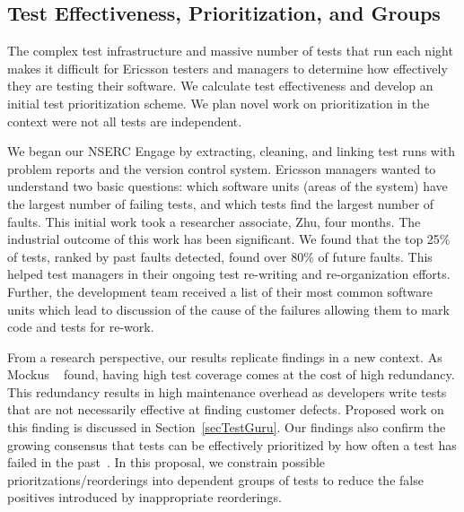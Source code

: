 \subsection{Test Effectiveness, Prioritization, and Groups}

The complex test infrastructure and massive number of tests that run each night makes it difficult for Ericsson testers and managers to determine how effectively they are testing their software. We calculate test effectiveness and develop an initial test prioritization scheme. We plan novel work on prioritization in the context were not all tests are independent.

We began our NSERC Engage by extracting, cleaning, and linking test runs with problem reports and the version control system. Ericsson managers wanted to understand two basic questions: which software units (areas of the system) have the largest number of failing tests, and which tests find the largest number of faults. 
%
This initial work took a researcher associate, Zhu, four months. The industrial outcome of this work has been significant. We found that the top 25\% of tests, ranked by past faults detected, found over 80\% of future faults.
%
%
This helped test managers in their ongoing test re-writing and re-organization efforts. Further, the development team received a list of their most common software units which lead to discussion of the cause of the failures allowing them to mark code and tests for re-work. 

From a research perspective, our results replicate findings in a new context. As Mockus \etal~\cite{Mockus2009ESEM} found, having high test coverage comes at the cost of high redundancy. This redundancy results in high maintenance overhead as developers write tests that are not necessarily effective at finding customer defects. Proposed work on this finding is discussed in Section~\ref{secTestGuru}. Our findings also confirm the growing consensus that tests can be effectively prioritized by how often a test has failed in the past~\cite{Kim2002ICSE,Hemmati}. In this proposal, we constrain possible prioritzations/reorderings into dependent groups of tests to reduce the false positives introduced by inappropriate reorderings.

